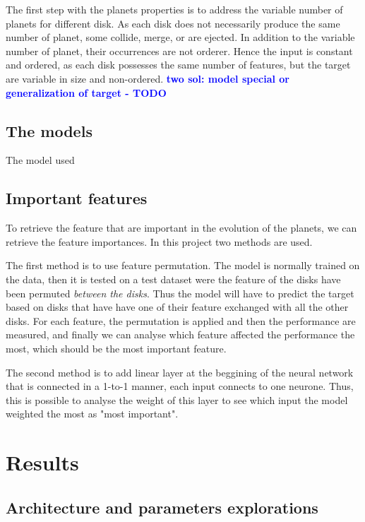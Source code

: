 \documentclass[a4paper, 11pt]{article}
\newcommand{\todonote}[3] {
	\textbf{\textcolor{#2}{#3 - #1}}
}
\newcommand{\todo}[1] {\todonote{TODO}{blue}{#1}}
\begin{document}
    The first step with the planets properties is to address the variable number of planets for different disk. As each disk does not necessarily produce the same number of planet, some collide, merge, or are ejected.  In addition to the variable number of planet, their occurrences are not orderer.  Hence the input is constant and ordered, as each disk possesses the same number of features, but the target are variable in size and non-ordered. \todo{two sol: model special or generalization of target}
    
    
    
    \subsection{The models}
    
    The model used 
    
    \subsection{Important features}
    
    To retrieve the feature that are important in the evolution of the planets, we can retrieve the feature importances. In this project two methods are used.
    
    The first method is to use feature permutation. The model is normally trained on the data, then it is tested on a test dataset were the feature of the disks have been permuted \textit{between the disks}. Thus the model will have to predict the target based on disks that have have one of their feature exchanged with all the other disks. For each feature, the permutation is applied and then the performance are measured, and finally we can analyse which feature affected the performance the most, which should be the most important feature.
    
    The second method is to add linear layer at the beggining of the neural network that is connected in a 1-to-1 manner, each input connects to one neurone. Thus, this is possible to analyse the weight of this layer to see which input the model weighted the most as "most important".
    \section{Results}
    
    \subsection{Architecture and  parameters explorations}
       
\end{document}
